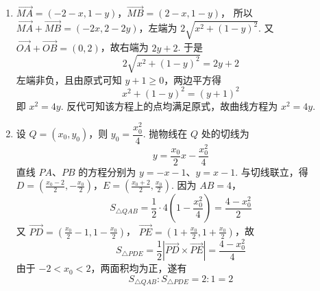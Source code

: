 \begin{solution}
\begin{enumerate}
\item
\(\overrightarrow{MA}=(-2-x,1-y)\)，\(\overrightarrow{MB}=(2-x,1-y)\)，
所以 \(\overrightarrow{MA}+\overrightarrow{MB}=(-2x,2-2y)\)，左端为
\(2\sqrt{x^2+(1-y)^2}\). 又
\(\overrightarrow{OA}+\overrightarrow{OB}=(0,2)\)，故右端为 \(2y+2\). 于是
\[
2\sqrt{x^2+(1-y)^2}=2y+2
\]
左端非负，且由原式可知 \(y+1\geqslant0\)，两边平方得
\[
x^2+(1-y)^2=(y+1)^2
\]
即 \(x^2=4y\). 反代可知该方程上的点均满足原式，故曲线方程为 \(x^2=4y\).

\item 设 \(Q=(x_0,y_0)\)，则 \(y_0=\dfrac{x_0^2}{4}\). 抛物线在 \(Q\) 处的切线为
\[
y=\frac{x_0}{2}x-\frac{x_0^2}{4}
\]
直线 \(PA\)、\(PB\) 的方程分别为 \(y=-x-1\)、\(y=x-1\). 与切线联立，得
\(D=\left(\frac{x_0-2}{2},-\frac{x_0}{2}\right)\)，\(E=\left(\frac{x_0+2}{2},\frac{x_0}{2}\right)\).
因为 \(AB=4\)，
\[
S_{\triangle QAB}=\frac12\cdot4\left(1-\frac{x_0^2}{4}\right)=\frac{4-x_0^2}{2}
\]
又 \(\overrightarrow{PD}=\left(\frac{x_0}{2}-1,1-\frac{x_0}{2}\right)\)，
\(\overrightarrow{PE}=\left(1+\frac{x_0}{2},1+\frac{x_0}{2}\right)\)，故
\[
S_{\triangle PDE}=\frac12\left|\overrightarrow{PD}\times\overrightarrow{PE}\right|=\frac{4-x_0^2}{4}
\]
由于 \(-2<x_0<2\)，两面积均为正，遂有
\[
S_{\triangle QAB}:S_{\triangle PDE}=2:1=2
\]
\end{enumerate}
\end{solution}
